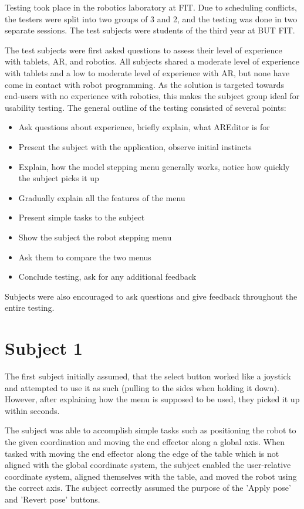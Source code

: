 Testing took place in the robotics laboratory at FIT. Due to scheduling conflicts, the testers were split into two groups of 3 and 2, and the testing was done in two separate sessions. The test subjects were students of the third year at BUT FIT. 

The test subjects were first asked questions to assess their level of experience with tablets, AR, and robotics. All subjects shared a moderate level of experience with tablets and a low to moderate level of experience with AR, but none have come in contact with robot programming. As the solution is targeted towards end-users with no experience with robotics, this makes the subject group ideal for usability testing. The general outline of the testing consisted of several points:

\begin{itemize}
    \item Ask questions about experience, briefly explain, what AREditor is for
    \item Present the subject with the application, observe initial instincts
    \item Explain, how the model stepping menu generally works, notice how quickly the subject picks it up
    \item Gradually explain all the features of the menu
    \item Present simple tasks to the subject
    \item Show the subject the robot stepping menu
    \item Ask them to compare the two menus
    \item Conclude testing, ask for any additional feedback
\end{itemize}

Subjects were also encouraged to ask questions and give feedback throughout the entire testing.

\section*{Subject 1}

The first subject initially assumed, that the select button worked like a joystick and attempted to use it as such (pulling to the sides when holding it down). However, after explaining how the menu is supposed to be used, they picked it up within seconds. 

The subject was able to accomplish simple tasks such as positioning the robot to the given coordination and moving the end effector along a global axis. When tasked with moving the end effector along the edge of the table which is not aligned with the global coordinate system, the subject enabled the user-relative coordinate system, aligned themselves with the table, and moved the robot using the correct axis. The subject correctly assumed the purpose of the 'Apply pose' and 'Revert pose' buttons. 

